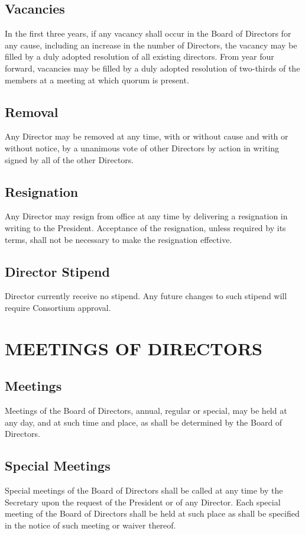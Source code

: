 \documentclass{article}
\begin{document}
\subsection{Vacancies}
In the first three years, if any vacancy shall occur in the Board of Directors for any cause, including an increase in the number of Directors, the vacancy may be filled by a duly adopted resolution of all existing directors. From year four forward, vacancies may be filled by a duly adopted resolution of  two-thirds of the members at a meeting at which quorum is present.
\subsection{Removal}
Any Director may be removed at any time, with or without cause and with or without notice, by a unanimous vote of other Directors by action in writing signed by all of the other Directors.
\subsection{Resignation}
Any Director may resign from office at any time by delivering a resignation in writing to the President.  Acceptance of the resignation, unless required by its terms, shall not be necessary to make the resignation effective.
\subsection{Director Stipend}
Director currently receive no stipend. Any future changes to such stipend will require Consortium approval.
\section{MEETINGS OF DIRECTORS}
\subsection{Meetings}
Meetings of the Board of Directors, annual, regular or special, may be held at any day, and at such time and place, as shall be determined by the Board of Directors.
\subsection{Special Meetings}
Special meetings of the Board of Directors shall be called at any time by the Secretary upon the request of the President or of any Director.  Each special meeting of the Board of Directors shall be held at such place as shall be specified in the notice of such meeting or waiver thereof.
\end{document}

